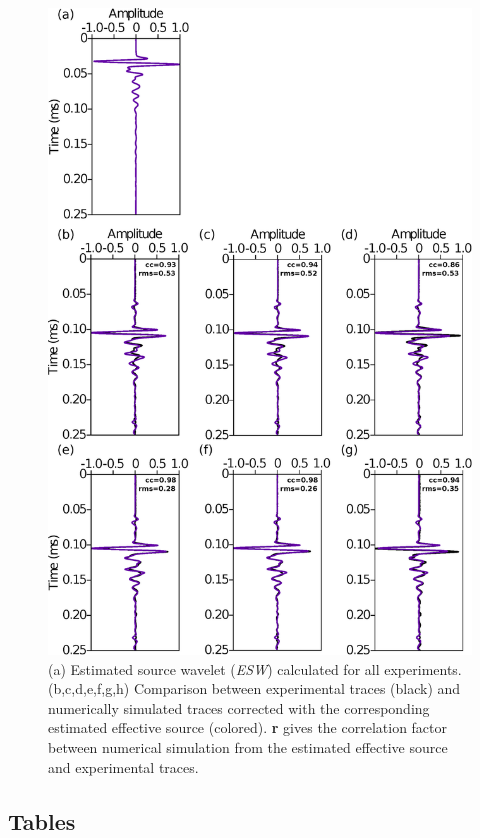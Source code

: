 \documentclass[manuscript,revised]{geophysics}
\begin{document}
\begin{figure}[!h]
	\centering
	\includegraphics[scale=0.4]{fig/panel_lswe_all.eps}
	\caption{(a) Estimated source wavelet (\textit{ESW}) calculated for all experiments. (b,c,d,e,f,g,h) Comparison between experimental traces (black) and numerically simulated traces corrected with the corresponding estimated effective source (colored). \textbf{r} gives the correlation factor between numerical simulation from the estimated effective source and experimental traces.}
	\label{panel_srcest_2d_mean}
\end{figure}

\clearpage
\newpage

\subsection*{Tables}
\end{document}
